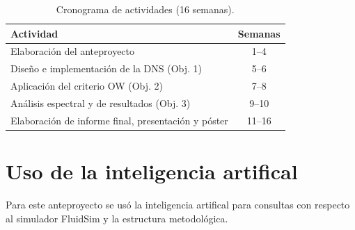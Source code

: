 \begin{table}[h]
\centering
\scriptsize
\setlength{\tabcolsep}{2pt}
\begin{tabular}{|p{3.1cm}|c|}
\hline
\textbf{Actividad} & \textbf{Semanas} \\
\hline
Elaboración del anteproyecto & 1--4 \\
\hline
Diseño e implementación de la DNS (Obj. 1) & 5--6 \\
\hline
Aplicación del criterio OW (Obj. 2) & 7--8 \\
\hline
Análisis espectral y de resultados (Obj. 3) & 9--10 \\
\hline
Elaboración de informe final, presentación y póster & 11--16 \\
\hline
\end{tabular}
\caption{Cronograma de actividades (16 semanas).}
\label{tab:cronograma}
\end{table}

\section{Uso de la inteligencia artifical}

Para este anteproyecto se usó la inteligencia artifical
para consultas con respecto al simulador FluidSim y la estructura metodológica.






\clearpage
\appendix



